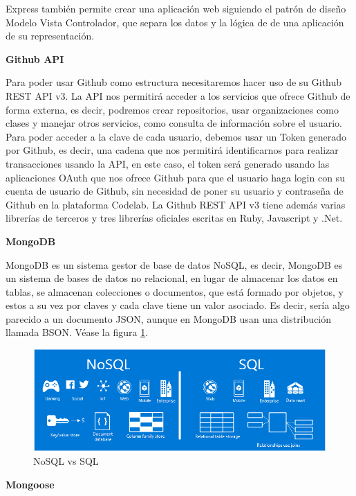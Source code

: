 Express también permite crear una aplicación web siguiendo el patrón de diseño Modelo Vista Controlador, que separa los datos y la lógica de de una aplicación de su representación.

{\bf Github API}

Para poder usar Github como estructura necesitaremos hacer uso de su Github REST API v3. 
La API nos permitirá acceder a los servicios que ofrece Github de forma externa, es decir, podremos crear repositorios, usar organizaciones como clases y manejar otros servicios, como consulta de información sobre el usuario.
Para poder acceder a la clave de cada usuario, debemos usar un Token generado por Github, es decir, una cadena que nos permitirá  identificarnos para realizar transacciones usando la API, en este caso, el token será generado usando las aplicaciones OAuth que nos ofrece Github para que el usuario haga login con su cuenta de usuario de Github, sin necesidad de poner su usuario y contraseña de Github en la plataforma Codelab.
La Github REST API v3 tiene además varias librerías de terceros y tres librerías oficiales escritas en Ruby, Javascript y .Net.

{\bf MongoDB}

MongoDB es un sistema gestor de base de datos NoSQL, es decir,
MongoDB es un sistema de bases de datos no relacional, en lugar de
almacenar los datos en tablas, se almacenan colecciones o documentos,
que está formado por objetos, y estos a su vez por claves y cada
clave tiene un valor asociado. Es decir, sería algo parecido a un
documento JSON, aunque en MongoDB usan una distribución llamada
BSON.  Véase la figura \ref{fig:NoSQLvsSQL}.

\begin{figure}[!th]
\begin{center}
\includegraphics[scale=0.5]{images/nosql}
\caption{NoSQL vs SQL}
\label{fig:NoSQLvsSQL}
\end{center}
\end{figure}

{\bf Mongoose}

